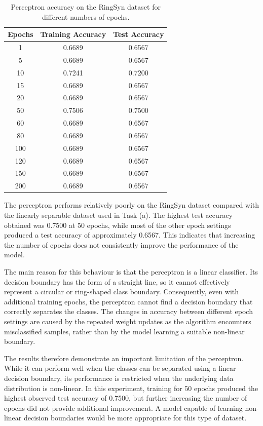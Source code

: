 \documentclass[a4paper,12pt]{article}
\begin{document}
\begin{table}[ht]
	\centering
	\caption{Perceptron accuracy on the RingSyn dataset for different numbers of epochs.}
	\label{tab:ring_perceptron_results}
	\begin{tabular}{c|c|c}
		\hline
		\textbf{Epochs} & \textbf{Training Accuracy} & \textbf{Test Accuracy} \\
		\hline
		1   & 0.6689 & 0.6567 \\
		5   & 0.6689 & 0.6567 \\
		10  & 0.7241 & 0.7200 \\
		15  & 0.6689 & 0.6567 \\
		20  & 0.6689 & 0.6567 \\
		50  & 0.7506 & 0.7500 \\
		60  & 0.6689 & 0.6567 \\
		80  & 0.6689 & 0.6567 \\
		100 & 0.6689 & 0.6567 \\
		120 & 0.6689 & 0.6567 \\
		150 & 0.6689 & 0.6567 \\
		200 & 0.6689 & 0.6567 \\
		\hline
	\end{tabular}
\end{table}

The perceptron performs relatively poorly on the RingSyn dataset compared with the linearly separable dataset used in Task (a). The highest test accuracy obtained was 0.7500 at 50 epochs, while most of the other epoch settings produced a test accuracy of approximately 0.6567. This indicates that increasing the number of epochs does not consistently improve the performance of the model.

The main reason for this behaviour is that the perceptron is a linear classifier. Its decision boundary has the form of a straight line, so it cannot effectively represent a circular or ring-shaped class boundary. Consequently, even with additional training epochs, the perceptron cannot find a decision boundary that correctly separates the classes. The changes in accuracy between different epoch settings are caused by the repeated weight updates as the algorithm encounters misclassified samples, rather than by the model learning a suitable non-linear boundary.

The results therefore demonstrate an important limitation of the perceptron. While it can perform well when the classes can be separated using a linear decision boundary, its performance is restricted when the underlying data distribution is non-linear. In this experiment, training for 50 epochs produced the highest observed test accuracy of 0.7500, but further increasing the number of epochs did not provide additional improvement. A model capable of learning non-linear decision boundaries would be more appropriate for this type of dataset.
\end{document}
